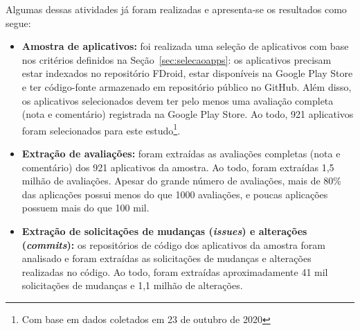 Algumas dessas atividades já foram realizadas e apresenta-se os resultados como segue:
\begin{itemize}
 \item \textbf{Amostra de aplicativos: } foi realizada uma seleção de aplicativos com base nos critérios definidos na Seção~\ref{sec:selecaoapps}: os aplicativos precisam estar indexados no repositório FDroid, estar disponíveis na Google Play Store e ter código-fonte armazenado em repositório público no GitHub. Além disso, os aplicativos selecionados devem ter pelo menos uma avaliação completa (nota e comentário) registrada na Google Play Store. Ao todo, 921 aplicativos foram selecionados para este estudo\footnote{Com base em dados coletados em 23 de outubro de 2020}.
 
 \item \textbf{Extração de avaliações: } foram extraídas as avaliações completas (nota e comentário) dos 921 aplicativos da amostra. Ao todo, foram extraídas 1,5 milhão de avaliações. Apesar do grande número de avaliações, mais de 80\% das aplicações possui menos do que 1000 avaliações, e poucas aplicações possuem mais do que 100 mil.
 
 \item \textbf{Extração de solicitações de mudanças (\textit{issues}) e alterações (\textit{commits}): } os repositórios de código dos aplicativos da amostra foram analisado e foram extraídas as solicitações de mudanças e alterações realizadas no código. Ao todo, foram extraídas aproximadamente 41 mil solicitações de mudanças e 1,1 milhão de alterações.

  
\end{itemize}



